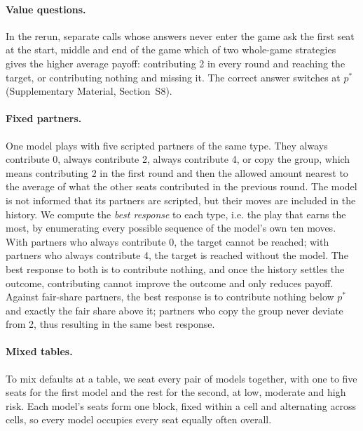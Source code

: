 \documentclass[sigconf,anonymous]{aamas}
\newcommand{\popt}{p^{*}}
\begin{document}
\paragraph{Value questions.}
In the rerun, separate calls whose answers never enter the game ask the first seat at the start, middle and end of the game which of two whole-game strategies gives the higher average payoff: contributing 2 in every round and reaching the target, or contributing nothing and missing it. The correct answer switches at $\popt$ (Supplementary Material, Section~S8).

\paragraph{Fixed partners.}
One model plays with five scripted partners of the same type. They always contribute 0, always contribute 2, always contribute 4, or copy the group, which means contributing  2 in the first round and then the allowed amount nearest to the average of what the other seats contributed in the previous round. The model is not informed that its partners are scripted, but their moves are included in the history. We compute the \emph{best response} to each type, i.e. the play that earns the most, by enumerating every possible sequence of the model’s own ten moves. With partners who always contribute 0, the target cannot be reached; with partners who always contribute 4, the target is reached without the model. The best response to both is to contribute nothing, and once the history settles the outcome, contributing cannot improve the outcome and only reduces payoff. Against fair-share partners, the best response is to contribute nothing below $\popt$ and exactly the fair share above it; partners who copy the group never deviate from 2, thus resulting in the same best response.

\paragraph{Mixed tables.}
To mix defaults at a table, we seat every pair of models together, with one to five seats for the first model and the rest for the second, at low, moderate and high risk. Each model's seats form one block, fixed within a cell and alternating across cells, so every model occupies every seat equally often  overall.
\end{document}

